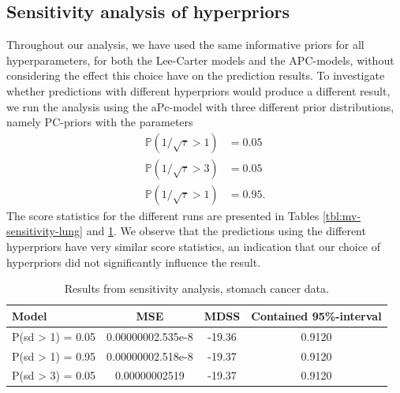 \subsection{Sensitivity analysis of hyperpriors}
Throughout our analysis, we have used the same informative priors for all hyperparameters, for both the Lee-Carter models and the APC-models, without considering the effect this choice have on the prediction results. To investigate whether predictions with different hyperpriors would produce a different result, we run the analysis using the aPc-model with three different prior distributions, namely PC-priors with the parameters
\begin{equation}
    \begin{aligned}
        \mathbb{P}(1/\sqrt{\tau} > 1) & = 0.05 \\
        \mathbb{P}(1/\sqrt{\tau} > 3) & = 0.05 \\
        \mathbb{P}(1/\sqrt{\tau} > 1) & = 0.95.
    \end{aligned}
\end{equation}
The score statistics for the different runs are presented in Tables \ref{tbl:mv-sensitivity-lung} and \ref{tbl:mv-sensitivity-stomach}. We observe that the predictions using the different hyperpriors have very similar score statistics, an indication that our choice of hyperpriors did not significantly influence the result. 


\begin{table}
    \begin{center}
        \begin{tabular}{l |c c c }
        Model & MSE &   MDSS & Contained 95\%-interval\\
        \hline
        P(sd > 1) = 0.05 & 0.00000002.535e-8 & -19.36    & 0.9120\\
        P(sd > 1) = 0.95 & 0.00000002.518e-8 & -19.37    & 0.9120\\
        P(sd > 3) = 0.05 & 0.00000002519 & -19.37    & 0.9120\\
        \end{tabular}
    \caption{Results from sensitivity analysis, stomach cancer data.}\label{tbl:mv-sensitivity-stomach}
    \end{center}
\end{table}

